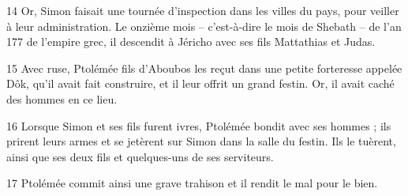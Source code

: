 14 Or, Simon faisait une tournée d’inspection dans les villes du pays, pour veiller à leur administration. Le onzième mois – c’est-à-dire le mois de Shebath – de l’an 177 de l’empire grec, il descendit à Jéricho avec ses fils Mattathias et Judas.

15 Avec ruse, Ptolémée fils d’Aboubos les reçut dans une petite forteresse appelée Dôk, qu’il avait fait construire, et il leur offrit un grand festin. Or, il avait caché des hommes en ce lieu.

16 Lorsque Simon et ses fils furent ivres, Ptolémée bondit avec ses hommes ; ils prirent leurs armes et se jetèrent sur Simon dans la salle du festin. Ils le tuèrent, ainsi que ses deux fils et quelques-uns de ses serviteurs.

17 Ptolémée commit ainsi une grave trahison et il rendit le mal pour le bien.
